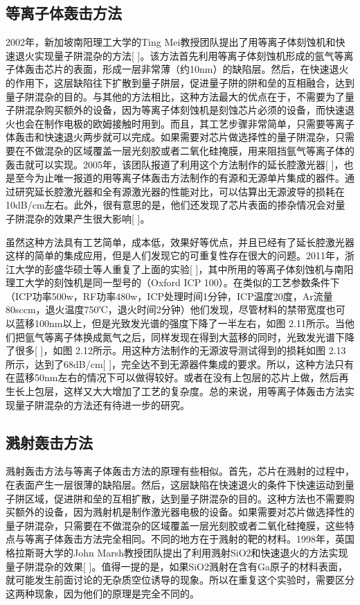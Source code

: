 \documentclass[oneside]{ZJUthesis}
\begin{document}
\subsection{等离子体轰击方法}

2002年，新加坡南阳理工大学的Ting Mei教授团队提出了用等离子体刻蚀机和快速退火实现量子阱混杂的方法[ ]。该方法首先利用等离子体刻蚀机形成的氩气等离子体轰击芯片的表面，形成一层非常薄（约10nm）的缺陷层。然后，在快速退火的作用下，这层缺陷往下扩散到量子阱层，促进量子阱的阱和垒的互相融合，达到量子阱混杂的目的。与其他的方法相比，这种方法最大的优点在于，不需要为了量子阱混杂购买额外的设备，因为等离子体刻蚀机是刻蚀芯片必须的设备，而快速退火也会在制作电极的欧姆接触时用到。而且，其工艺步骤非常简单，只需要等离子体轰击和快速退火两步就可以完成。如果需要对芯片做选择性的量子阱混杂，只需要在不做混杂的区域覆盖一层光刻胶或者二氧化硅掩膜，用来阻挡氩气等离子体的轰击就可以实现。2005年，该团队报道了利用这个方法制作的延长腔激光器[ ]，也是至今为止唯一报道的用等离子体轰击方法制作的有源和无源单片集成的器件。通过研究延长腔激光器和全有源激光器的性能对比，可以估算出无源波导的损耗在10dB/cm左右。此外，很有意思的是，他们还发现了芯片表面的掺杂情况会对量子阱混杂的效果产生很大影响[ ]。

虽然这种方法具有工艺简单，成本低，效果好等优点，并且已经有了延长腔激光器这样的简单的集成应用，但是人们发现它的可重复性存在很大的问题。2011年，浙江大学的彭盛华硕士等人重复了上面的实验[ ]，其中所用的等离子体刻蚀机与南阳理工大学的刻蚀机是同一型号的（Oxford ICP 100）。在类似的工艺参数条件下（ICP功率500w，RF功率480w，ICP处理时间1分钟，ICP温度20度，Ar流量80sccm，退火温度750℃，退火时间2分钟）他们发现，尽管材料的禁带宽度也可以蓝移100nm以上，但是光致发光谱的强度下降了一半左右，如图 2.11所示。当他们把氩气等离子体换成氮气之后，同样发现在得到大蓝移的同时，光致发光谱下降了很多[ ]，如图 2.12所示。用这种方法制作的无源波导测试得到的损耗如图 2.13所示，达到了68dB/cm[ ]，完全达不到无源器件集成的要求。所以，这种方法只有在蓝移50nm左右的情况下可以做得较好。或者在没有上包层的芯片上做，然后再生长上包层，这样又大大增加了工艺的复杂度。总的来说，用等离子体轰击方法实现量子阱混杂的方法还有待进一步的研究。

\subsection{溅射轰击方法}

溅射轰击方法与等离子体轰击方法的原理有些相似。首先，芯片在溅射的过程中，在表面产生一层很薄的缺陷层。然后，这层缺陷在快速退火的条件下快速运动到量子阱区域，促进阱和垒的互相扩散，达到量子阱混杂的目的。这种方法也不需要购买额外的设备，因为溅射机是制作激光器电极的设备。如果需要对芯片做选择性的量子阱混杂，只需要在不做混杂的区域覆盖一层光刻胶或者二氧化硅掩膜，这些特点与等离子体轰击方法完全相同。不同的地方在于溅射的靶的材料。1998年，英国格拉斯哥大学的John Marsh教授团队提出了利用溅射SiO2和快速退火的方法实现量子阱混杂的效果[ ]。值得一提的是，如果SiO2溅射在含有Ga原子的材料表面，就可能发生前面讨论的无杂质空位诱导的现象。所以在重复这个实验时，需要区分这两种现象，因为他们的原理是完全不同的。
\end{document}
